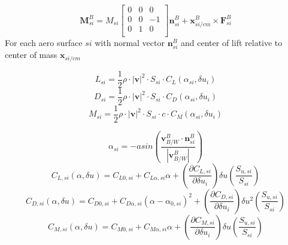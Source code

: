 \documentclass[11pt]{amsart}
\renewcommand{\vec}{\mathbf}
\begin{document}
$$
\vec{M}_{si}^B = M_{si}
\begin{bmatrix}
    0 &0 &0 \\
    0 &0 &-1 \\
    0 &1 &0 \\
\end{bmatrix}
\vec{n}_{si}^B
+
\vec{x}_{si/cm}^B \times \vec{F}_{si}^B
$$
For each aero surface $si$ with normal vector $\vec{n}_{si}^B$ and
center of lift relative to center of mass $\vec{x}_{si/cm}$

$$
L_{si} = \frac{1}{2}\rho \cdot \left|\vec{v}\right|^2 \cdot S_{si} \cdot C_L(\alpha_{si}, \delta u_i)
$$
$$
D_{si} = \frac{1}{2}\rho \cdot \left|\vec{v}\right|^2 \cdot S_{si} \cdot C_D(\alpha_{si}, \delta u_i)
$$
$$
M_{si} = \frac{1}{2}\rho \cdot \left|\vec{v}\right|^2 \cdot S_{si} \cdot c \cdot C_M(\alpha_{si}, \delta u_i)
$$

$$
\alpha_{si} = -asin\left(\frac{\vec{v}_{B/W}^B\cdot \vec{n}_{si}^B}{\left|\vec{v}_{B/W}^B\right|}\right)
$$
$$
C_{L,si}(\alpha, \delta u) = C_{L0,si} + C_{L\alpha,si}\alpha +
\left(\frac{\partial C_{L,si}}{\partial \delta u_i}\right)\delta u
\left(\frac{S_{u,si}}{S_{si}}\right)
$$
$$
C_{D,si}(\alpha, \delta u) = C_{D0,si} + C_{D\alpha,si}\left(\alpha - \alpha_{0,si}\right)^2 +
\left(\frac{\partial C_{D,si}}{\partial \delta u_i}\right)\delta u^2
\left(\frac{S_{u,si}}{S_{si}}\right)
$$
$$
C_{M,si}(\alpha, \delta u) = C_{M0,si} + C_{M\alpha,si}\alpha +
\left(\frac{\partial C_{M,si}}{\partial \delta u_i}\right)\delta u
\left(\frac{S_{u,si}}{S_{si}}\right)
$$
\end{document}
